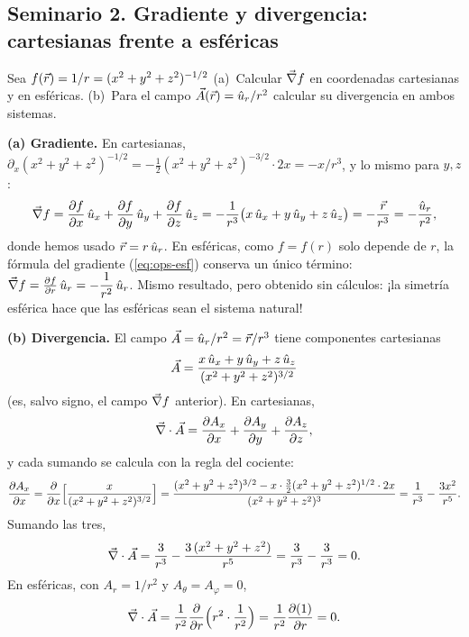 

\subsection{Seminario 2. Gradiente y divergencia: cartesianas frente a esféricas}\label{sem:inverso}
\begin{ejercicio}\label{ejer:inverso}
Sea $f(\vec{r})=1/r=(x^{2}+y^{2}+z^{2})^{-1/2}$ (a)~Calcular $\vec{\nabla} f$ en
coordenadas cartesianas y en esféricas. (b)~Para el campo
$\vec{A}(\vec{r})=\hat{u}_{r}/r^{2}$ calcular su divergencia en ambos sistemas.
\end{ejercicio}

\begin{resolucion}
\textbf{(a) Gradiente.} En cartesianas, $\partial_x(x^{2}+y^{2}+z^{2})^{-1/2}=-\tfrac12(x^{2}+y^{2}+z^{2})^{-3/2}\cdot2x=-x/r^{3}$, y lo mismo para $y,z$:
\[
  \vec{\nabla} f=\frac{\partial f}{\partial x}\,\hat{u}_{x}+\frac{\partial f}{\partial y}\,\hat{u}_{y}+\frac{\partial f}{\partial z}\,\hat{u}_{z}
  =-\frac{1}{r^{3}}\bigl(x\,\hat{u}_{x}+y\,\hat{u}_{y}+z\,\hat{u}_{z}\bigr)=-\frac{\vec{r}}{r^{3}}=-\frac{\hat{u}_{r}}{r^{2}},
\]
donde hemos usado $\vec{r}=r\,\hat{u}_{r}$. En esféricas, como $f=f(r)$ solo depende de
$r$, la fórmula del gradiente (\cref{eq:ops-esf}) conserva un único término:
$\vec{\nabla} f=\frac{\partial f}{\partial r}\,\hat{u}_{r}=-\dfrac{1}{r^{2}}\,\hat{u}_{r}$. Mismo resultado, pero obtenido
sin cálculos: ¡la simetría esférica hace que las esféricas sean el sistema
natural!

\textbf{(b) Divergencia.} El campo $\vec{A}=\hat{u}_{r}/r^{2}=\vec{r}/r^{3}$ tiene
componentes cartesianas
\[
  \vec{A}=\frac{x\,\hat{u}_{x}+y\,\hat{u}_{y}+z\,\hat{u}_{z}}{(x^{2}+y^{2}+z^{2})^{3/2}}
\]
(es, salvo signo, el campo $\vec{\nabla} f$ anterior). En cartesianas,
\[
  \vec{\nabla}\cdot\vec{A}=\frac{\partial A_x}{\partial x}+\frac{\partial A_y}{\partial y}+\frac{\partial A_z}{\partial z},
\]
y cada sumando se calcula con la regla del cociente:
\[
  \frac{\partial A_x}{\partial x}=\frac{\partial }{\partial x}\Bigl[\frac{x}{(x^{2}+y^{2}+z^{2})^{3/2}}\Bigr]
  =\frac{(x^{2}+y^{2}+z^{2})^{3/2}-x\cdot\frac{3}{2}(x^{2}+y^{2}+z^{2})^{1/2}\cdot2x}{(x^{2}+y^{2}+z^{2})^{3}}
  =\frac{1}{r^{3}}-\frac{3x^{2}}{r^{5}} .
\]
Sumando las tres,
\[
  \vec{\nabla}\cdot\vec{A}=\frac{3}{r^{3}}-\frac{3\,(x^{2}+y^{2}+z^{2})}{r^{5}}=\frac{3}{r^{3}}-\frac{3}{r^{3}}=0 .
\]
En esféricas, con $A_r=1/r^{2}$ y $A_\theta=A_\varphi=0$,
\[
  \vec{\nabla}\cdot\vec{A}=\frac{1}{r^{2}}\frac{\partial }{\partial r}\Bigl(r^{2}\cdot\frac{1}{r^{2}}\Bigr)=\frac{1}{r^{2}}\frac{\partial (1)}{\partial r}=0 .
\]
\end{resolucion}

